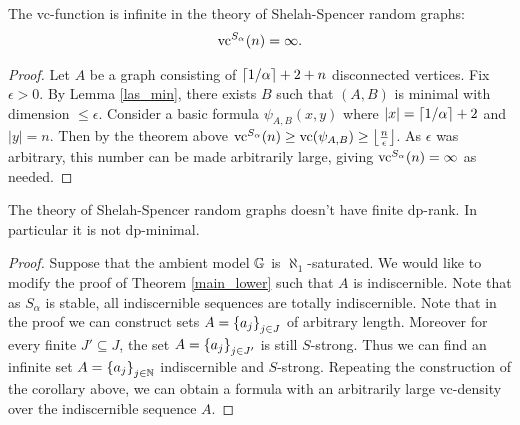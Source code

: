\documentclass{amsart}
\begin{document}
\begin{Corollary}
  The vc-function is infinite in the theory of Shelah-Spencer random graphs:
  \begin{align*}
    \operatorname{vc}^{S_\alpha}(n) = \infty.
  \end{align*}
\end{Corollary}

\begin{proof}
  Let $A$ be a graph consisting of $\left \lceil 1/\alpha \right \rceil + 2 + n$ disconnected vertices.
  Fix $\epsilon > 0$.
  By Lemma \ref{las_min}, there exists $B$ such that $(A, B)$ is minimal with dimension $\leq \epsilon$.
  Consider a basic formula $\psi_{A, B}(x, y)$ where $|x| = \left \lceil 1/\alpha \right \rceil + 2$ and $|y| = n$.
  Then by the theorem above $\operatorname{vc}^{S_\alpha}(n) \geq \operatorname{vc} (\psi_{A,B}) \geq \left \lfloor \frac{n}{\epsilon} \right \rfloor$.
  As $\epsilon$ was arbitrary, this number can be made arbitrarily large, giving $\operatorname{vc}^{S_\alpha}(n) = \infty$ as needed.
\end{proof}

\begin{Corollary}
  The theory of Shelah-Spencer random graphs doesn't have finite dp-rank.
  In particular it is not dp-minimal.
\end{Corollary}

\begin{proof}
  Suppose that the ambient model $\mathbb G$ is $\aleph_1$-saturated.
  We would like to modify the proof of Theorem \ref{main_lower} such that $A$ is indiscernible.
  Note that as $S_\alpha$ is stable, all indiscernible sequences are totally indiscernible.
  Note that in the proof we can construct sets $A = \left\{a_j\right\}_{j \in J}$ of arbitrary length.
  Moreover for every finite $J' \subseteq J$, the set $A = \left\{a_j\right\}_{j \in J'}$ is still $S$-strong.
  Thus we can find an infinite set $A = \left\{a_j\right\}_{j \in \mathbb{N}}$ indiscernible and $S$-strong.
  Repeating the construction of the corollary above,
  we can obtain a formula with an arbitrarily large vc-density over the indiscernible sequence $A$.
\end{proof}



\end{document}
